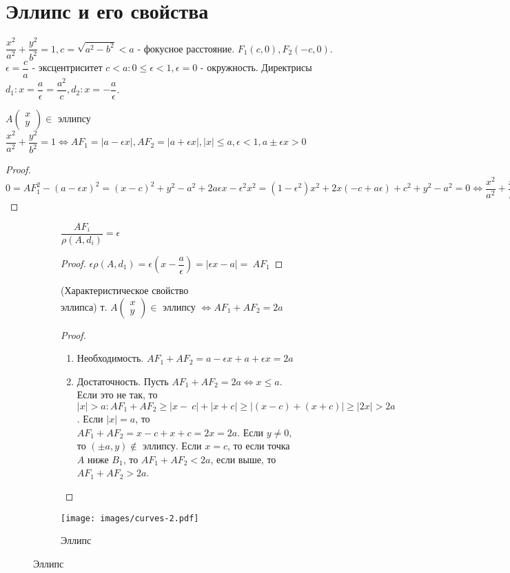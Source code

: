 \section{Эллипс и его свойства}
\(\dfrac{x^2}{a^2}+\dfrac{y^2}{b^2} = 1, c = \sqrt{a^2-b^2}<a\) - фокусное расстояние. \(F_1(c, 0), F_2(-c,0)\). \(\epsilon = \dfrac{c}{a}\) - эксцентриситет \(c<a: 0\le\epsilon<1, \epsilon=0\) - окружность. Директрисы \(d_1: x= \dfrac{a}{\epsilon} = \dfrac{a^2}{c}, d_2: x = -\dfrac{a}{\epsilon}\).
\begin{proposition}
	\(A\begin{pmatrix}
		x \\ y
	\end{pmatrix}\in\) эллипсу \(\dfrac{x^2}{a^2}+\dfrac{y^2}{b^2}=1\Longleftrightarrow AF_1=|a-\epsilon x|, AF_2 = |a+\epsilon x|, |x|\le a, \epsilon<1, a\pm\epsilon x>0\)
\end{proposition}
\begin{proof}
	\(0 = AF_1^2-(a-\epsilon x)^2 = (x-c)^2+y^2-a^2+2a\epsilon x - \epsilon^2x^2=(1-\epsilon^2)x^2+2x(-c+a\epsilon)+c^2+y^2-a^2 = 0\Longleftrightarrow \dfrac{x^2}{a^2}+\dfrac{x^2}{b^2}=1\Longleftrightarrow (x,y)\in\text{Г}\) 
\end{proof}

\begin{figure}[h]
	\begin{subfigure}[t!]{0.6\linewidth}
		\begin{corollary}
			\(\dfrac{AF_i}{\rho(A,d_i)}=\epsilon\)
		\end{corollary}
		\begin{proof}
			\(\epsilon\rho(A,d_1) = \epsilon(x-\dfrac{a}{\epsilon})=|\epsilon x - a| =~AF_1\)
		\end{proof}
		\begin{theorem}
			(Характеристическое свойство \\ эллипса) т. \(A\begin{pmatrix}
				x \\ y
			\end{pmatrix}\in\) эллипсу \(\Longleftrightarrow AF_1+AF_2 = 2a\)
		\end{theorem}
		\begin{proof}
			\begin{enumerate}
				\item Необходимость. \(AF_1+AF_2 = a- \epsilon x + a + \epsilon x = 2a\)
				\item Достаточность. Пусть \(AF_1 + AF_2 = 2a\Longleftrightarrow x\le a\). Если это не так, то \(|x|>a: AF_1 + AF_2 \ge |x-~c| + |x+c|\ge|(x-c)+(x+c)|\ge|2x|>2a\).
				Если \(|x| = a\), то \(AF_1 + AF_2 = x - c + x + c = 2x = 2a\). Если \(y\ne0,\) то \((\pm a, y)\not\in\) эллипсу. Если \(x = c\), то если точка \(A\) ниже \(B_1\), то \(AF_1 + AF_2 < 2a\), если выше, то \(AF_1+AF_2>2a\). 
			\end{enumerate}
		\end{proof}
	\end{subfigure}
	\begin{subfigure}[b!]{0.4\linewidth}
		\centering
		\texttt{[image: images/curves-2.pdf]}
		\caption*{Эллипс}
		\label{Curve1}
	\end{subfigure}
\end{figure}

